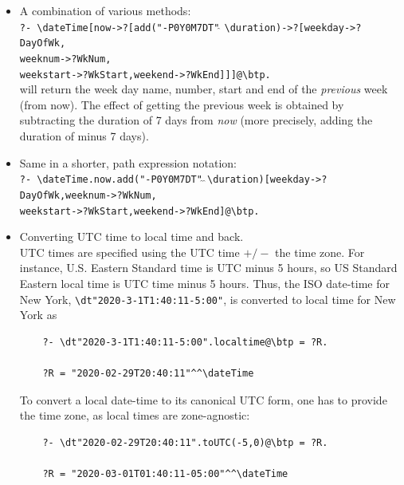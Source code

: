 \documentclass[11pt]{article}
\newcommand{\bs}{\textbackslash}
\begin{document}
\begin{itemize}
    \verb|?WkStart = "2021-03-07T12:12:55"^^\dateTime|\\
    \verb|?WkEnd = "2021-03-13T12:12:55"^^\dateTime|
  \item A combination of various methods:\\
    \texttt{?- \bs{}dateTime[now->?[add("-P0Y0M7DT"$\hat{~}\hat{~}$\bs{}duration)->?[weekday->?DayOfWk,\\
      \hspace*{45mm}weeknum->?WkNum,\\
      \hspace*{45mm}weekstart->?WkStart,weekend->?WkEnd]]]@\bs{}btp.}
    \\
    will return the week day name, number, start and end of the \emph{previous}
    week (from now).
    The effect of getting the previous week is obtained by subtracting the
    duration of 7 days from \emph{now} (more precisely, adding the duration
    of minus 7 days).
  \item Same in a shorter, path expression notation:\\
    \texttt{?- \bs{}dateTime.now.add("-P0Y0M7DT"$\hat{~}\hat{~}$\bs{}duration)[weekday->?DayOfWk,weeknum->?WkNum,\\
    \hspace*{70mm}weekstart->?WkStart,weekend->?WkEnd]@\bs{}btp.}
  \item Converting UTC time to local time and back.
    \\
    UTC times are specified using
    the UTC time $+/-$ the time zone. For instance, U.S. Eastern Standard
    time is UTC minus 5 hours, so US Standard Eastern local time is UTC
    time minus 5 hours. Thus, the ISO date-time for
    New York,
    \texttt{\bs{}dt"2020-3-1T1:40:11-5:00"},
    is converted to local time for New York as
\begin{verbatim}
    ?- \dt"2020-3-1T1:40:11-5:00".localtime@\btp = ?R.

    ?R = "2020-02-29T20:40:11"^^\dateTime
\end{verbatim}
    
    To convert a local date-time to its canonical UTC form, one has to
    provide the time zone, as local times are zone-agnostic:
\begin{verbatim}
    ?- \dt"2020-02-29T20:40:11".toUTC(-5,0)@\btp = ?R.

    ?R = "2020-03-01T01:40:11-05:00"^^\dateTime
\end{verbatim}
\end{itemize}
\end{document}
